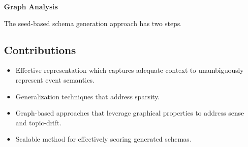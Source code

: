 \textbf{Graph Analysis} 

The seed-based schema generation approach has two steps.


\subsection{Contributions}

\begin{itemize}
\item Effective representation which captures adequate context to unambiguously represent event semantics. 
\item Generalization techniques that address sparsity. 
\item Graph-based approaches that leverage graphical properties to address sense and topic-drift. 
\item Scalable method for effectively scoring generated schemas. 
\end{itemize}

